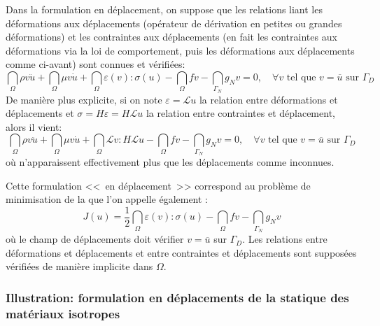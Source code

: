 \medskip
Dans la formulation en déplacement, on suppose que les relations liant les
déformations aux déplacements (opérateur de dérivation en petites ou grandes
déformations) et les contraintes aux déplacements (en fait les contraintes aux
déformations via la loi de comportement, puis les déformations aux déplacements
comme ci-avant) sont connues et vérifiées:
\begin{equation}
\dint_\Omega \rho v\ddot{u} + \dint_\Omega \mu v\dot{u}
+\dint_\Omega \varepsilon(v):\sigma(u) - \dint_\Omega fv
-\dint_{\Gamma_N} g_N v =0, \quad \forall v \text{ tel que } v=\overline{u} \text{ sur } \Gamma_D
\end{equation}
De manière plus explicite, si on note $\varepsilon=\mathcal{L}u$ la relation entre
déformations et déplacements et $\sigma = H\varepsilon = H\mathcal{L}u$ la relation entre
contraintes et déplacement, alors il vient:
\begin{equation}
\dint_\Omega \rho v\ddot{u} + \dint_\Omega \mu v\dot{u}
+\dint_\Omega \mathcal{L}v:H\mathcal{L}u - \dint_\Omega fv
-\dint_{\Gamma_N} g_N v =0, \quad \forall v \text{ tel que } v=\overline{u} \text{ sur } \Gamma_D
\end{equation}
où n'apparaissent effectivement plus que les déplacements comme inconnues.


\medskip
Cette formulation <<~en déplacement~>> correspond au problème de minimisation
de la 
que l'on appelle également :
\begin{equation}
J(u)=
\frac12 \dint_\Omega \varepsilon(v):\sigma(u)  - \dint_\Omega fv -
\dint_{\Gamma_N} g_N v
\end{equation}
où le champ de déplacements doit vérifier $v=\overline{u}$ sur $\Gamma_D$.
Les relations entre déformations et déplacements et entre contraintes et déplacements
sont supposées vérifiées de manière implicite dans $\Omega$.

\medskip
\subsubsection{Illustration: formulation en déplacements de la statique des matériaux isotropes}


